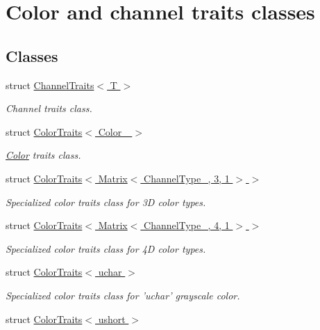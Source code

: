 \hypertarget{group___color_traits}{\section{Color and channel traits classes}
\label{group___color_traits}
}
\subsection*{Classes}
\begin{DoxyCompactItemize}
\item 
struct \hyperlink{struct_d_o_1_1_channel_traits}{Channel\-Traits$<$ T $>$}
\begin{DoxyCompactList}\small\item\em Channel traits class. \end{DoxyCompactList}\item 
struct \hyperlink{struct_d_o_1_1_color_traits}{Color\-Traits$<$ Color\-\_\- $>$}
\begin{DoxyCompactList}\small\item\em \hyperlink{class_d_o_1_1_color}{Color} traits class. \end{DoxyCompactList}\item 
struct \hyperlink{struct_d_o_1_1_color_traits_3_01_matrix_3_01_channel_type___00_013_00_011_01_4_01_4}{Color\-Traits$<$ Matrix$<$ Channel\-Type\-\_\-, 3, 1 $>$ $>$}
\begin{DoxyCompactList}\small\item\em Specialized color traits class for 3\-D color types. \end{DoxyCompactList}\item 
struct \hyperlink{struct_d_o_1_1_color_traits_3_01_matrix_3_01_channel_type___00_014_00_011_01_4_01_4}{Color\-Traits$<$ Matrix$<$ Channel\-Type\-\_\-, 4, 1 $>$ $>$}
\begin{DoxyCompactList}\small\item\em Specialized color traits class for 4\-D color types. \end{DoxyCompactList}\item 
struct \hyperlink{struct_d_o_1_1_color_traits_3_01uchar_01_4}{Color\-Traits$<$ uchar $>$}
\begin{DoxyCompactList}\small\item\em Specialized color traits class for 'uchar' grayscale color. \end{DoxyCompactList}\item 
struct \hyperlink{struct_d_o_1_1_color_traits_3_01ushort_01_4}{Color\-Traits$<$ ushort $>$}

\end{DoxyCompactItemize}
